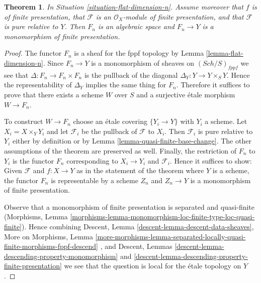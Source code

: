 \documentclass{stacks-project}
\theoremstyle{plain}
\newtheorem{theorem}[subsection]{Theorem}
\theoremstyle{definition}
\theoremstyle{remark}
\numberwithin{equation}{subsection}
\def\Sch{\mathit{Sch}}
\begin{document}
\begin{theorem}
\label{theorem-flat-dimension-n-representable}
In Situation \ref{situation-flat-dimension-n}.
Assume moreover that $f$ is of finite presentation, that
$\mathcal{F}$ is an $\mathcal{O}_X$-module of finite presentation,
and that $\mathcal{F}$ is pure relative to $Y$.
Then $F_n$ is an algebraic space and
$F_n \to Y$ is a monomorphism of finite presentation.
\end{theorem}

\begin{proof}
The functor $F_n$ is a sheaf for the fppf topology by
Lemma \ref{lemma-flat-dimension-n}.
Since $F_n \to Y$ is a monomorphism of sheaves on
$(\Sch/S)_{fppf}$ we see that $\Delta : F_n \to F_n \times F_n$
is the pullback of the diagonal $\Delta_Y : Y \to Y \times_S Y$.
Hence the representability of $\Delta_Y$ implies the same
thing for $F_n$. Therefore it suffices to prove that
there exists a scheme $W$ over $S$ and a surjective \'etale morphism
$W \to F_n$.

\medskip\noindent
To construct $W \to F_n$ choose an \'etale covering $\{Y_i \to Y\}$
with $Y_i$ a scheme. Let $X_i = X \times_Y Y_i$ and let
$\mathcal{F}_i$ be the pullback of $\mathcal{F}$ to $X_i$.
Then $\mathcal{F}_i$ is pure relative to $Y_i$ either by definition
or by Lemma \ref{lemma-quasi-finite-base-change}.
The other assumptions of the theorem are preserved as well.
Finally, the restriction of $F_n$ to $Y_i$ is
the functor $F_n$ corresponding to $X_i \to Y_i$ and $\mathcal{F}_i$.
Hence it suffices to show: Given $\mathcal{F}$ and $f : X \to Y$
as in the statement of the theorem where $Y$ is a scheme, the
functor $F_n$ is representable by a scheme $Z_n$ and
$Z_n \to Y$ is a monomorphism of finite presentation.

\medskip\noindent
Observe that a monomorphism of finite presentation is
separated and quasi-finite (Morphisms, Lemma
\ref{morphisms-lemma-monomorphism-loc-finite-type-loc-quasi-finite}).
Hence combining
Descent, Lemma \ref{descent-lemma-descent-data-sheaves},
More on Morphisms, Lemma
\ref{more-morphisms-lemma-separated-locally-quasi-finite-morphisms-fppf-descend}
, and
Descent, Lemmas \ref{descent-lemma-descending-property-monomorphism} and
\ref{descent-lemma-descending-property-finite-presentation}
we see that the question is local for the \'etale topology on $Y$.


\end{proof}
\end{document}
